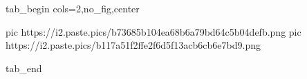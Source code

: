  
 
 
 
 

\ifcmt
  tab_begin cols=2,no_fig,center

     pic https://i2.paste.pics/b73685b104ea68b6a79bd64c5b04defb.png
		 pic https://i2.paste.pics/b117a51f2ffe2f6d5f13acb6cb6e7bd9.png

  tab_end
\fi

